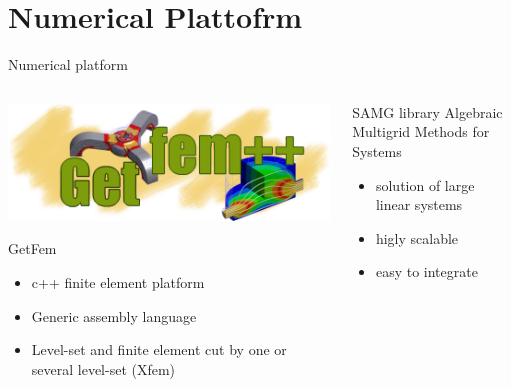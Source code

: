 \documentclass{beamer}
\begin{document}
\section{Numerical Plattofrm}
\begin{frame}{Numerical platform}
\begin{columns}
\begin{column}{0.45\textwidth}
\includegraphics[width=0.8\columnwidth]{figure/logogetfem}
\begin{block}{GetFem}
\begin{itemize}
\item c++ finite element platform
\item Generic assembly language
\item Level-set and finite element cut 
	by one or several level-set (Xfem) 
\end{itemize}
\end{block}
\end{column}
\begin{column}{0.45\textwidth}
\begin{block}{SAMG library}
Algebraic Multigrid Methods for Systems
\begin{itemize}
\item solution of large linear systems
\item higly scalable
\item easy to integrate
\end{itemize}
\end{block}
\end{column}
\end{columns}
\end{frame}
\end{document}
